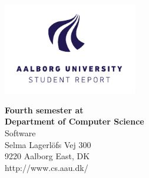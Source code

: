 

{}
\thispagestyle{empty}

\begin{minipage}[t]{0.48\textwidth}
\vspace*{-25pt}			%
\includegraphics[height=4cm]{billeder/AAU-logo-stud-UK-RGB}
\end{minipage}
\hfill
\begin{minipage}[t]{0.48\textwidth}
{\small 
\textbf{Fourth semester at}\\
\textbf{Department of Computer Science}  \\
Software \\
Selma Lagerlöfs Vej 300 \\
9220 Aalborg East, DK \\
http://www.cs.aau.dk/}
\end{minipage}

\vspace*{1cm}

